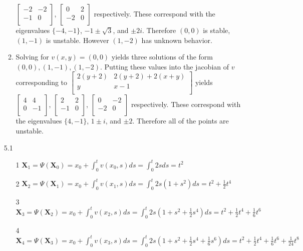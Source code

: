 \documentclass[12pt, letterpaper]{article}
\begin{document}
\begin{enumerate}
\begin{enumerate}
	$\begin{bmatrix} -2 & -2 \\ -1 & 0 \\ \end{bmatrix}$, $\begin{bmatrix} 0 & 2 \\ -2 & 0 \\ \end{bmatrix}$ respectively.  These correspond with the eigenvalues $\{-4,-1\}$, $-1\pm \sqrt{3}$, and $\pm 2i$.  Therefore $(0,0)$ is stable, $(1,-1)$ is unstable.  However $(1,-2)$ has unknown behavior.  
			\item  Solving for $v(x,y) = (0,0)$ yields three solutions of the form $(0,0), (1,-1), (1,-2)$.  Putting these values into the jacobian of $v$ corresponding to $\begin{bmatrix} 2 (y+2) & 2 (y+2) + 2 (x+y) \\ y & x-1 \\ \end{bmatrix}$ yields  
			$\begin{bmatrix}  4 & 4 \\ 0 & -1 \\\end{bmatrix}$,	$\begin{bmatrix} 2 & 2 \\ -1 & 0 \\ \end{bmatrix}$, 
			$\begin{bmatrix} 0 & -2 \\ -2 & 0 \\ \end{bmatrix}$ respectively.   These correspond with the eigenvalues $\{4,-1\}$, $1\pm i$, and $\pm 2$.  Therefore all of the points are unstable.  
		\end{enumerate}				
		\item[5.1] 
		\begin{enumerate}
			\item[1] $\textbf{X}_1 = \Psi(\textbf{X}_0) = x_0 + \int_0^t v(x_0,s)ds = \int_0^t 2s ds = t^2$
			\item[2] $\textbf{X}_2 = \Psi(\textbf{X}_1) = x_0 + \int_0^t v(x_1,s)ds = \int_0^t 2s(1+s^2) ds = t^2 + \frac{1}{2}t^4$
			\item[3] $\textbf{X}_3 = \Psi(\textbf{X}_2) = x_0 + \int_0^t v(x_2,s)ds = \int_0^t 2s(1+s^2 + \frac{1}{2}s^4) ds = t^2 + \frac{1}{2}t^4 + \frac{1}{6} t^6$
			\item[4] $\textbf{X}_4 = \Psi(\textbf{X}_3) = x_0 + \int_0^t v(x_3,s)ds = \int_0^t 2s(1+s^2 + \frac{1}{2}s^4 + \frac{1}{6} s^6) ds = t^2 + \frac{1}{2}t^4 + \frac{1}{6} t^6 + \frac{1}{24} t^8$

\end{enumerate}
\end{enumerate}
\end{document}
